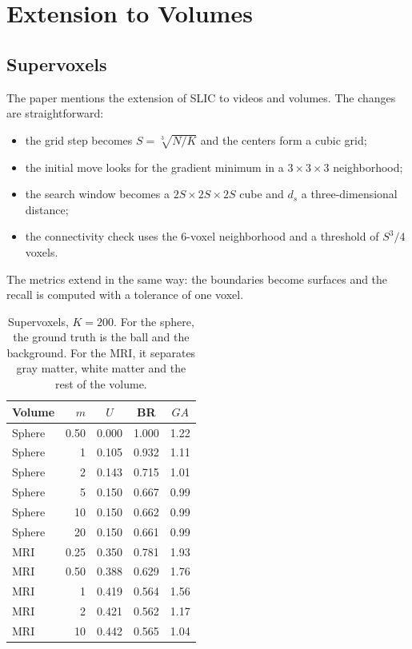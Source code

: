 \section{Extension to Volumes}\label{s:vol}
\subsection{Supervoxels}
The paper mentions the extension of SLIC to videos and
volumes. The changes are straightforward:
\begin{itemize}
\item the grid step becomes $S = \sqrt[3]{N/K}$ and the centers form a cubic grid;
\item the initial move looks for the gradient minimum in a $3 \times 3 \times 3$ neighborhood;
\item the search window becomes a $2S \times 2S \times 2S$ cube and $d_s$ a three-dimensional distance;
\item the connectivity check uses the 6-voxel neighborhood and a threshold of $S^3/4$ voxels.
\end{itemize}
The metrics extend in the same way: the boundaries
become surfaces and the recall is computed with a tolerance of one voxel.

\begin{table}[t]
\caption{Supervoxels, $K = 200$. For the sphere, the ground
truth is the ball and the background. For the MRI, it separates gray
matter, white matter and the rest of the volume.}\label{t:vox}
\centering\small
\begin{tabular}{lrccc}
\toprule
Volume & $m$ & $U$ & BR & $GA$\\
\midrule
Sphere & 0.50 & 0.000 & 1.000 & 1.22\\
Sphere & 1 & 0.105 & 0.932 & 1.11\\
Sphere & 2 & 0.143 & 0.715 & 1.01\\
Sphere & 5 & 0.150 & 0.667 & 0.99\\
Sphere & 10 & 0.150 & 0.662 & 0.99\\
Sphere & 20 & 0.150 & 0.661 & 0.99\\
\midrule
MRI & 0.25 & 0.350 & 0.781 & 1.93\\
MRI & 0.50 & 0.388 & 0.629 & 1.76\\
MRI & 1 & 0.419 & 0.564 & 1.56\\
MRI & 2 & 0.421 & 0.562 & 1.17\\
MRI & 10 & 0.442 & 0.565 & 1.04\\
\bottomrule
\end{tabular}
\end{table}

